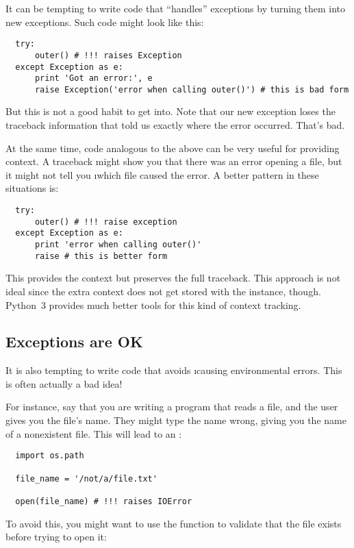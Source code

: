 \documentclass[letterpaper, 12pt, titlepage, twoside]{article}
\begin{document}
It can be tempting to write code that ``handles'' exceptions by turning them
into new exceptions. Such code might look like this:

\begin{lstlisting}
  try:
      outer() # !!! raises Exception
  except Exception as e:
      print 'Got an error:', e
      raise Exception('error when calling outer()') # this is bad form
\end{lstlisting}

But this is not a good habit to get into. Note that our new exception loses
the traceback information that told us exactly where the error occurred.
That's bad.

At the same time, code analogous to the above can be very useful for providing
context. A traceback might show you that there was an error opening a file,
but it might not tell you \i{which} file caused the error. A better pattern in
these situations is:

\begin{lstlisting}
  try:
      outer() # !!! raise exception
  except Exception as e:
      print 'error when calling outer()'
      raise # this is better form
\end{lstlisting}

This provides the context but preserves the full traceback. This approach is
not ideal since the extra context does not get stored with the 
instance, though. Python~3 provides much better tools for this kind of context
tracking.

\subsection*{Exceptions are OK}

It is also tempting to write code that avoids \i{causing} environmental
errors. This is often actually a bad idea!

For instance, say that you are writing a program that reads a file, and the
user gives you the file's name. They might type the name wrong, giving you the
name of a nonexistent file. This will lead to an :

\begin{lstlisting}
  import os.path

  file_name = '/not/a/file.txt'

  open(file_name) # !!! raises IOError
\end{lstlisting}

To avoid this, you might want to use the  function to
validate that the file exists before trying to open it:
\end{document}
